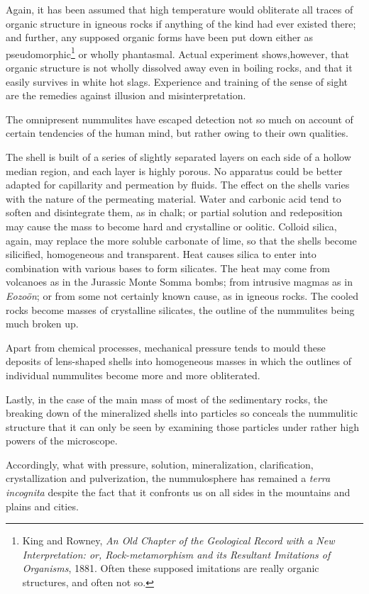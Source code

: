 \documentclass[a4paper, 12pt, oneside]{article}
\begin{document}
Again, it has been assumed that high temperature would obliterate all traces of organic structure in igneous rocks if anything of the kind had ever existed there; and further, any supposed organic forms have been put down either as pseudomorphic\footnote{King and Rowney, \emph{An Old Chapter of the Geological Record with a New Interpretation: or, Rock-metamorphism and its Resultant Imitations of Organisms}, 1881. Often these supposed imitations are really organic structures, and often not so.} or wholly phantasmal. Actual experiment shows,however, that organic structure is not wholly dissolved away even in boiling rocks, and that it easily survives in white hot slags. Experience and training of the sense of sight are the remedies against illusion and misinterpretation.

The omnipresent nummulites have escaped detection not so much on account of certain tendencies of the human mind, but rather owing to their own qualities.

The shell is built of a series of slightly separated layers on each side of a hollow median region, and each layer is highly porous. No apparatus could be better adapted for capillarity and permeation by fluids. The effect on the shells varies with the nature of the permeating material. Water and carbonic acid tend to soften and disintegrate them, as in chalk; or partial solution and redeposition may cause the mass to become hard and crystalline or oolitic. Colloid silica, again, may replace the more soluble carbonate of lime, so that the shells become silicified, homogeneous and transparent. Heat causes silica to enter into combination with various bases to form silicates. The heat may come from volcanoes as in the Jurassic Monte Somma bombs; from intrusive magmas as in \emph{Eozoön}; or from some not certainly known cause, as in igneous rocks. The cooled rocks become masses of crystalline silicates, the outline of the nummulites being much broken up.

Apart from chemical processes, mechanical pressure tends to mould these deposits of lens-shaped shells into homogeneous masses in which the outlines of individual nummulites become more and more obliterated.

Lastly, in the case of the main mass of most of the sedimentary rocks, the breaking down of the mineralized shells into particles so conceals the nummulitic structure that it can only be seen by examining those particles under rather high powers of the microscope.

Accordingly, what with pressure, solution, mineralization, clarification, crystallization and pulverization, the nummulosphere has remained a \emph{terra incognita} despite the fact that it confronts us on all sides in the mountains and plains and cities.
\end{document}
